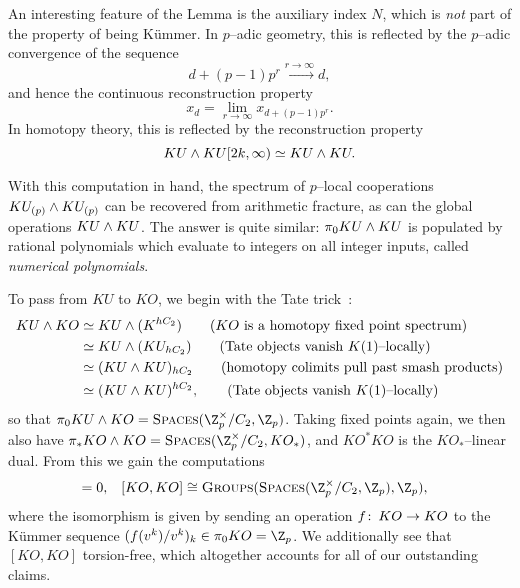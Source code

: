 \begin{remark}
An interesting feature of the Lemma is the auxiliary index \(N\), which is \emph{not} part of the property of being K\"ummer.  In \(p\)--adic geometry, this is reflected by the \(p\)--adic convergence of the sequence \[d + (p-1)p^r \xrightarrow{r \to \infty} d,\] and hence the continuous reconstruction property \[x_d = \lim_{r \to \infty} x_{d + (p-1)p^r}.\]  In homotopy theory, this is reflected by the reconstruction property \[KU \wedge KU[2k, \infty) \simeq KU \wedge KU.\]
\end{remark}

\begin{remark}
With this computation in hand, the spectrum of \(p\)--local cooperations \(KU_{(p)} \wedge KU_{(p)}\) can be recovered from arithmetic fracture, as can the global operations \(KU \wedge KU\).  The answer is quite similar: \(\pi_0 KU \wedge KU\) is populated by rational polynomials which evaluate to integers on all integer inputs, called \textit{numerical polynomials}.
\end{remark}

To pass from \(KU\) to \(KO\), we begin with the Tate trick~\cite{ClausenMathew,GreenleesSadofsky,HoveySadofsky}:
\begin{align*}
KU \wedge KO & \simeq KU \wedge (K^{hC_2}) \tag{\(KO\) is a homotopy fixed point spectrum} \\
& \simeq KU \wedge (KU_{hC_2}) \tag{Tate objects vanish \(K(1)\)--locally} \\
& \simeq (KU \wedge KU)_{hC_2} \tag{homotopy colimits pull past smash products} \\
& \simeq (KU \wedge KU)^{hC_2}, \tag{Tate objects vanish \(K(1)\)--locally}
\end{align*}
so that \(\pi_0 KU \sm KO = \CatOf{Spaces}(\Z_p^\times / C_2, \Z_p)\).  Taking fixed points again, we then also have \(\pi_* KO \sm KO = \CatOf{Spaces}(\Z_p^\times / C_2, KO_*)\), and \(KO^* KO\) is the \(KO_*\)--linear dual.  From this we gain the computations
\begin{align*}
[\Susp^{-1} KO, KO] & = 0, &
[KO, KO] & \cong \CatOf{Groups}(\CatOf{Spaces}(\Z_p^\times / C_2, \Z_p), \Z_p),
\end{align*}
where the isomorphism is given by sending an operation $f\colon\thinspace KO \to KO$ to the K\"ummer sequence $(f(v^k)/v^k)_k \in \pi_0 KO = \Z_p$.  We additionally see that \([KO, KO]\) torsion-free, which altogether accounts for all of our outstanding claims.


